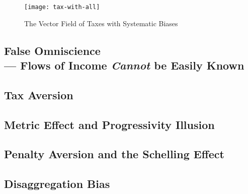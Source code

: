 
\begin{landscape}
 \begin{figure}[htbp]
	\begin{center}
	\texttt{[image: tax-with-all]}
	\caption[The Vector Field of Taxes with Systematic Biases]{The Vector Field of Taxes with Systematic Biases}
	\label{fig:tax-with-all}
	\end{center}
	
\end{figure}
\end{landscape}

\subsection[False Omniscience]{False Omniscience \\--- Flows of Income \emph{Cannot} be Easily Known}

\subsection{Tax Aversion}


\subsection{Metric Effect and Progressivity Illusion}


\subsection{Penalty Aversion and the Schelling Effect}

\subsection{Disaggregation Bias}

